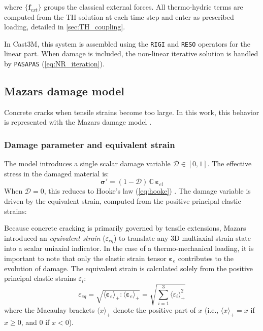 where $\{\mathbf{f}_{ext}\}$ groups the classical external forces. All thermo-hydric terms are computed from the TH solution at each time step and enter as prescribed loading, detailed in \cref{sec:TH_coupling}.

In Cast3M, this system is assembled using the \texttt{RIGI} and \texttt{RESO} operators for the linear part. When damage is included, the non-linear iterative solution is handled by \texttt{PASAPAS} (\cref{eq:NR_iteration}).

\subsection{Mazars damage model}

Concrete cracks when tensile strains become too large. In this work, this behavior is represented with the Mazars damage model \cite{hamon2013}. 

\subsubsection{Damage parameter and equivalent strain}

The model introduces a single scalar damage variable $\mathcal{D} \in [0,1]$. The effective stress in the damaged material is:
\begin{equation}
    \boldsymbol{\sigma}' = (1-\mathcal{D})\,
    \mathbb{C}\,\boldsymbol{\varepsilon}_{el}
    \label{eq:damage_stress}
\end{equation}
When $\mathcal{D}=0$, this reduces to Hooke's law  (\cref{eq:hooke}) \cite{hamon2013}. The damage variable is driven by the equivalent strain, computed from the positive principal elastic strains:

Because concrete cracking is primarily governed by tensile extensions, Mazars introduced an \textit{equivalent strain} ($\varepsilon_{eq}$) to translate any 3D multiaxial strain state into a scalar uniaxial indicator. In the case of a thermo-mechanical loading, it is important to note that only the elastic strain tensor $\boldsymbol{\varepsilon}_e$ contributes to the evolution of damage. The equivalent strain is calculated solely from the positive principal elastic strains $\varepsilon_i$:
\begin{equation}
    \varepsilon_{eq} = \sqrt{ \langle \boldsymbol{\varepsilon}_e \rangle_+ : \langle \boldsymbol{\varepsilon}_e \rangle_+} = \sqrt{ \sum_{i=1}^{3} \langle \varepsilon_i \rangle_+^2 }
\end{equation}
where the Macaulay brackets $\langle x \rangle_+$ denote the positive part of $x$ (i.e., $\langle x \rangle_+ = x$ if $x \ge 0$, and $0$ if $x < 0$). 

